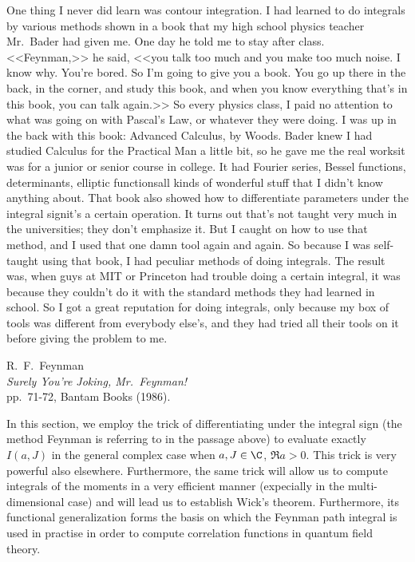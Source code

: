 \begin{quoting}%
   \openquote One thing I never did learn was contour integration. I had learned
   to do integrals by various methods shown in a book that my high school
   physics teacher Mr.~Bader had given me.  One day he told me to stay after
   class. <<Feynman,>> he said, <<you talk too much and you make too much noise.
   I know why. You're bored. So I'm going to give you a book. You go up there in
   the back, in the corner, and study this book, and when you know everything
   that's in this book, you can talk again.>> 
   So every physics class, I paid no
   attention to what was going on with Pascal's Law, or whatever they were
   doing. 
   \omissis{}
   I was up in the back with this book: Advanced Calculus, by Woods.
   Bader knew I had studied Calculus for the Practical Man a little bit, so he
   gave me the real works\textemdash it was for a junior or senior course in
   college. It had Fourier series, Bessel functions, determinants, elliptic
   functions\textemdash all kinds of wonderful stuff that I didn't know anything
   about. 
   That book also showed how to differentiate parameters under the
   integral sign\textemdash it's a certain operation. It turns out that's not
   taught very much in the universities; they don't emphasize it. But I caught
   on how to use that method, and I used that one damn tool again and again. 
   So
   because 
   I was self-taught using that book, I had peculiar methods of doing
   integrals. 
   \omissis{}
   The result was, when guys at MIT or Princeton had trouble doing a
   certain integral, it was because they couldn't do it with the standard
   methods they had learned in school.
   \omissis{}
   So I got a great reputation for doing integrals, only because my
   box of tools was different from everybody else's, and they had tried all
   their tools on it before giving the problem to me.~\closequote
   \begin{signature}
       R.~F.~Feynman \\
       \emph{Surely You're Joking, Mr.~Feynman!}\\
       pp.~71-72, Bantam Books (1986).
\end{signature}
\end{quoting}

\par\noindent
In this section, we employ the trick of 
differentiating under the integral sign (the method Feynman is referring to in
the passage above) to evaluate exactly $I(a,J)$ in the general complex case
when  $a,J\in\C$, $\Re a>0$.
This trick is very
powerful also elsewhere. Furthermore, the same trick will allow us to compute
integrals of the moments in a very efficient manner (expecially in the
multi-dimensional case) and will lead us to establish Wick's theorem. 
Furthermore, its functional generalization forms the basis on which the Feynman path integral is
used in practise in order to compute correlation functions in quantum field
theory.


